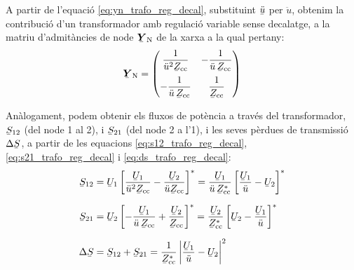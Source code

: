A partir de l'equaci\'{o}  \eqref{eq:yn_trafo_reg_decal}, substituint
$\cmplx{\ddot{u}}$ per $\ddot{u}$, obtenim la contribuci\'{o} d'un
transformador amb regulaci\'{o} variable sense decalatge, a la matriu
d'admit\`{a}ncies de node $\mcmplx{Y}\ped{N}$ de la xarxa a la qual
pertany: 
\begin{equation}
   \mcmplx{Y}\ped{N} = \begin{pmatrix}
     \dfrac{1}{\ddot{u}^2 \cmplx{Z}\ped{cc}} & - \dfrac{1}{\ddot{u} \,\cmplx{Z}\ped{cc}} \\[2.5ex]
     - \dfrac{1}{\ddot{u} \,\cmplx{Z}\ped{cc}} & \dfrac{1}{\cmplx{Z}\ped{cc}}
   \end{pmatrix}
\end{equation}

An\`{a}logament, podem obtenir els fluxos de pot\`{e}ncia a trav\'{e}s del
transformador, $\cmplx{S}_{12}$ (del node 1 al 2), i
$\cmplx{S}_{21}$ (del node 2 a l'1), i les seves p\`{e}rdues de
transmissi\'{o}  $\Delta\cmplx{S}$, a partir de les equacions
\eqref{eq:s12_trafo_reg_decal},  \eqref{eq:s21_trafo_reg_decal} i
\eqref{eq:ds_trafo_reg_decal}:  
\begin{align}
   \cmplx{S}_{12} &= \cmplx{U}_1 \left[ \frac{\cmplx{U}_1}{\ddot{u}^2 \cmplx{Z}\ped{cc}} - \frac{\cmplx{U}_2}{\ddot{u} \cmplx{Z}\ped{cc}} \right]^* = \frac{\cmplx{U}_1}{\ddot{u} \,\cmplx{Z}\ped{cc}^*} \left[ \frac{\cmplx{U}_1}{\ddot{u}} - \cmplx{U}_2 \right]^*  \\[1.5ex]
   \cmplx{S}_{21} &= \cmplx{U}_2 \left[ - \frac{\cmplx{U}_1}{\ddot{u} \,\cmplx{Z}\ped{cc}} + \frac{\cmplx{U}_2} {\cmplx{Z}\ped{cc}} \right]^* = \frac{\cmplx{U}_2}{\cmplx{Z}\ped{cc}^*} \left[  \cmplx{U}_2 - \frac{\cmplx{U}_1}{\ddot{u}}  \right]^* \\[1.5ex]
 \Delta\cmplx{S} &= \cmplx{S}_{12} + \cmplx{S}_{21} = \frac{1}{\cmplx{Z}\ped{cc}^*}  \left|
    \frac{\cmplx{U}_1}{\ddot{u}} - \cmplx{U}_2 \right|^2
\end{align}


